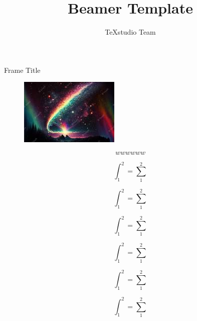 \documentclass{beamer}
\title{Beamer Template}
\author{TeXstudio Team}
\begin{document}
\begin{frame}[plain]
	\maketitle
\end{frame}
\begin{frame}{Frame Title}
	\begin{figure}
		\centering
		\includegraphics[width=0.7\linewidth]{screenshot001}
		\caption{}
		\label{fig:screenshot001}
	\end{figure}
	\begin{equation}
		wwwwww
		\label{www}
	\end{equation}
\end{frame}
\begin{frame}
	\begin{equation}\label{key}
		\int_{1}^{2}=\sum_{1}^{2}
	\end{equation}
\end{frame}
\begin{frame}
	\begin{equation}\label{key}
		\int_{1}^{2}=\sum_{1}^{2}
	\end{equation}
\end{frame}
\begin{frame}
	\begin{equation}\label{key}
		\int_{1}^{2}=\sum_{1}^{2}
	\end{equation}
\end{frame}
\begin{frame}
	\begin{equation}\label{key}
		\int_{1}^{2}=\sum_{1}^{2}
	\end{equation}
\end{frame}
\begin{frame}
	\begin{equation}\label{key}
		\int_{1}^{2}=\sum_{1}^{2}
	\end{equation}
\end{frame}
\begin{frame}
	\begin{equation}\label{key}
		\int_{1}^{2}=\sum_{1}^{2}
	\end{equation}
\end{frame}
\end{document}

